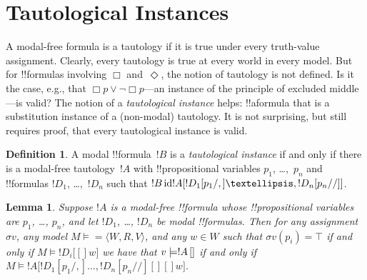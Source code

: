 \documentclass[10pt,a4paper]{article}
\theoremstyle{plain}
\newtheorem{lem}[thm]{Lemma}
\theoremstyle{definition}
\newtheorem{defn}[thm]{Definition}
\theoremstyle{remark}
\newenvironment{explain}{}{}
\newcommand*{\olfileid}[3]{}
\newcommand*{\olsection}[1]{\section*{#1}}
\newcommand*{\olchapter}[3]{}
\newcommand*{\olimport}[1]{}
\newcommand*{\ollabel}[1]{\label{#1}}
\providecommand{\True}{\top}
\providecommand{\mSat}[3]{\ensuremath{#1 \models #2[#3]}}
\providecommand{\mModel}[2]{\ensuremath{#1 \models #2}}
\providecommand{\tuple}[1]{\langle #1 \rangle}
\providecommand{\pSat}[3]{#1 \models #2\,[#3]}
\providecommand{\pAssign}{\sigma}
\providecommand{\SSubst}[3]{#1[#2/#3]}
\providecommand{\subst}[3]{#1[#2/#3]}
\providecommand{\ident}{\operatorname{id}}
\begin{document}



\olchapter{nml}{syn}{Syntax and Semantics}

\olimport{introduction}
\olimport{language-modal-logic}
\olimport{substitution}
\olimport{relational-models}
\olimport{truth-at-w}
\olimport{truth-in-model}
\olimport{modal-validity}
\olimport{tautological-instances}
\olimport{schemas}
\olimport{entailment}

\OLEndChapterHook






\olfileid{nml}{syn}{tau}

\olsection{Tautological Instances}

\begin{explain}
A modal-free formula is a tautology if it is true under every
truth-value assignment. Clearly, every tautology is true at every
world in every model. But for !!{formula}s involving $\Box$
and~$\Diamond$, the notion of tautology is not defined. Is it the
case, e.g., that $\Box p \lor \lnot \Box p$---an instance of the
principle of excluded middle---is valid? The notion of a
\emph{tautological instance} helps: !!a{formula} that is a
substitution instance of a (non-modal) tautology. It is not
surprising, but still requires proof, that every tautological instance
is valid.
\end{explain}

\begin{defn}
  A modal !!{formula}~$!B$ is a \emph{tautological instance} if and
  only if there is a modal-free tautology~$!A$ with !!{propositional
    variable}s $p_1$, \dots,~$p_n$ and !!{formula}s $!D_1$,
  \dots,~$!D_n$ such that $!B \ident \SSubst{!A}{\subst{!D_1}{p_1},
    \dots, \subst{!D_n}{p_n}}$.
\end{defn}

\begin{lem}\ollabel{lem:valid-taut}
  Suppose $!A$ is a modal-free !!{formula} whose !!{propositional
  variable}s are $p_1$, \dots, $p_n$, and let $!D_1$, \dots,
  $!D_n$ be modal !!{formula}s. Then for any assignment $\pAssign{v}$,
  any model $\mModel{M} = \tuple{W, R, V}$, and any $w \in W$ such
  that $\pAssign{v}(p_i) = \True$ if and only if $\mSat{M}{!D_i}[w]$ we have
  that $\pSat{v}{!A}$ if and only if
  $\mSat{M}{\SSubst{!A}{\subst{!D_1}{p_1}, \dots,
      \subst{!D_n}{p_n}}}[w]$.
\end{lem}
\end{document}
